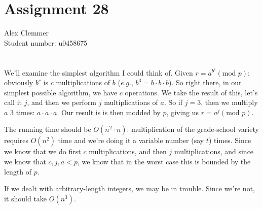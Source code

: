 \documentclass[a4paper]{article}
\begin{document}
\section*{Assignment 28}
Alex Clemmer\\
Student number: u0458675

\section*{}

We'll examine the simplest algorithm I could think of. Given $r = a^{b^c} (\mbox{mod } p)$: obviously $b^c$ is $c$ multiplications of $b$ ($\textit{e.g.}$, $b^3 = b \cdot b \cdot b$). So right there, in our simplest possible algorithm, we have $c$ operations. We take the result of this, let's call it $j$, and then we perform $j$ multiplications of $a$. So if $j=3$, then we multiply $a$ 3 times: $a \cdot a \cdot a$. Our result is is then modded by $p$, giving us $r = a^j (\mbox{mod } p)$.

The running time should be $O(n^2 \cdot n)$: multiplication of the grade-school variety requires $O(n^2)$ time and we're doing it a variable number (say $t$) times. Since we know that we do first $c$ multiplications, and then $j$ multiplications, and since we know that $c, j, a < p$, we know that in the worst case this is bounded by the length of $p$.

If we dealt with arbitrary-length integers, we may be in trouble. Since we're not, it should take $O(n^3)$.
\end{document}
